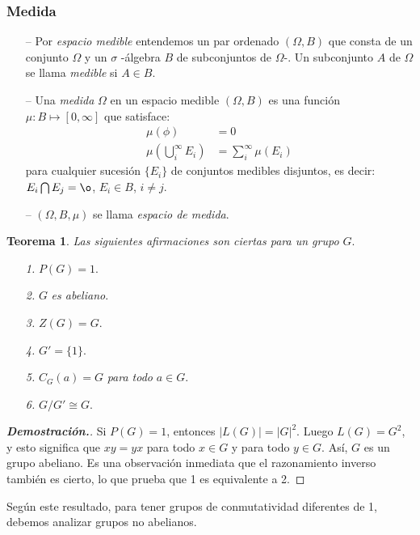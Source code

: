 \documentclass{article}
\theoremstyle{definition}
\newtheorem{teor}{Teorema}
\begin{document}
\subsubsection{Medida}
\begin{itemize}
\item[--] Por \textit{espacio medible} entendemos un par ordenado $(\Omega,B)$ que consta de un conjunto $\Omega$ y un $\sigma$ -álgebra $B$ de subconjuntos de $\Omega$-. Un subconjunto $A$ de $\Omega$ se llama \textit{medible} si $A \in B$.
\item[--] Una \textit{medida} $\Omega$ en un espacio medible $(\Omega,B)$ es una función $\mu : B \mapsto [0, \infty]$ que satisface:
\begin{align*}
\mu(\phi) &= 0\\
\mu( \bigcup_{i}^{\infty} E_i) &=  \sum_{i}^{\infty} \mu(E_i)
\end{align*}
para cualquier sucesión $\{E_i\}$ de conjuntos medibles disjuntos, es decir: $E_i \bigcap E_j=\o$, $E_i \in B$, $i\neq j$.
\item[--] $(\Omega, B, \mu)$ se llama \textit{espacio de medida}.

\end{itemize}
\begin{teor}\label{teorema}
\textit{Las siguientes afirmaciones son ciertas para un grupo $G$}.
\end{teor}
\begin{multicols}{2}
\begin{enumerate}
\item[\textit{1.}] $P(G)=1$.
\item[\textit{2.}] $G$ \textsl{es abeliano}.
\item[\textit{3.}] $Z(G)=G$.
\item[\textit{4.}] ${G}'=\{1\}$.
\item[\textit{5.}] $C_{G}(a)=G$ \textsl{para todo} $a \in G$.
\item[\textit{6.}] $G/{G}'\cong G$.
\end{enumerate}
\end{multicols}
    
\begin{proof}[\textbf{{Demostración.}}] Si $P(G)=1$, entonces $|L(G)|=|G|^2$. Luego $L(G)=G^2$, y esto significa que $xy=yx$ para todo $x \in G$ y para todo $y \in G$. Así, $G$ es un grupo abeliano. Es una observación inmediata que el razonamiento inverso también es cierto, lo que prueba que 1 es equivalente a 2.
\end{proof}
Según este resultado, para tener grupos de conmutatividad diferentes de 1, debemos analizar grupos no abelianos.
\end{document}

